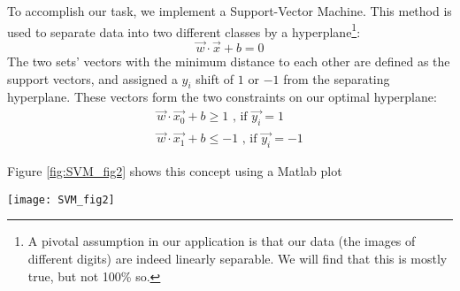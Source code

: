%
%

To accomplish our task, we implement a Support-Vector Machine. This method is used to separate data into two different classes by a hyperplane\footnote{A pivotal assumption in our application is that our data (the images of different digits) are indeed linearly separable. We will find that this is mostly true, but not 100\% so.}:
\begin{equation}
\vec{w}\cdot\vec{x} + b = 0
\end{equation}
The two sets' vectors with the minimum distance to each other are defined as the support vectors, and assigned a $y_{i}$ shift of $1$ or $-1$ from the separating hyperplane. These vectors form the two constraints on our optimal hyperplane:
\begin{equation}
\begin{gathered}
	\vec{w}\cdot\vec{x_0} + b \geq 1 \text{ , if } \vec{y_i} = 1 \\
	\vec{w}\cdot\vec{x_1} + b \leq -1 \text{ , if } \vec{y_i} = -1 
\end{gathered}
\end{equation}

Figure \ref{fig:SVM_fig2} shows this concept using a Matlab plot

\begin{figure*}[!htb]
	\texttt{[image: SVM\_fig2]}
	\centering
	\caption{The hyperplane is constrained to be within the limits of the margin, which are themselves defined by the support vectors.}
	\label{fig:SVM_fig2}
\end{figure*}

